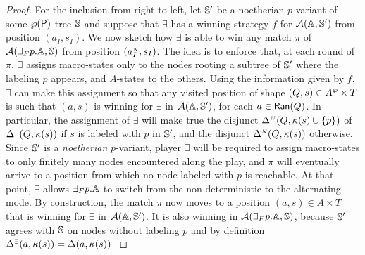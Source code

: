 \begin{proof}
For the inclusion from right to left, let $\mathbb{S}'$ be a noetherian $p$-variant of some ${\wp (\mathsf{P})}$-tree $\mathbb{S}$ and suppose that $\exists$ has a winning strategy $f$ for $\mathcal{A}(\mathbb{A},\mathbb{S}')$ from position $(a_I,s_I)$. We now sketch how $\exists$ is able to win any match $\pi$ of $\mathcal{A}({{\exists}_F p}.\mathbb{A},\mathbb{S})$ from position $(a_I^{{\scriptscriptstyle N}},s_I)$. The idea is to enforce that, at each round of $\pi$, $\exists$ assigns macro-states only to the nodes rooting a subtree of $\mathbb{S}'$ where the labeling $p$ appears, and $A$-states to the others. Using the information given by $f$, $\exists$ can make this assignment so that any visited position of shape $(Q,s) \in A^{\wp} \times T$ is such that $(a,s)$ is winning for $\exists$ in $\mathcal{A}(\mathbb{A},\mathbb{S}')$, for each $a \in \mathsf{Ran}(Q)$. In particular, the assignment of $\exists$ will make true the disjunct $\Delta^{{\scriptscriptstyle N}}(Q,\kappa(s)\cup\{p\})$ of $\Delta^\exists(Q,\kappa(s))$ if $s$ is labeled with $p$ in $\mathbb{S}'$, and the disjunct $\Delta^{{\scriptscriptstyle N}}(Q,\kappa(s))$ otherwise. Since $\mathbb{S}'$ is a \emph{noetherian} $p$-variant, player $\exists$ will be required to assign macro-states to only finitely many nodes encountered along the play, and $\pi$ will eventually arrive to a position from which no node labeled with $p$ is reachable. At that point, $\exists$ allows ${{\exists}_F p}.\mathbb{A}$ to switch from the non-deterministic to the alternating mode. By construction, the match $\pi$ now moves to a position $(a,s) \in A \times T$ that is winning for $\exists$ in $\mathcal{A}(\mathbb{A},\mathbb{S}')$. It is also winning in $\mathcal{A}({{\exists}_F p}.\mathbb{A},\mathbb{S})$, because $\mathbb{S}'$ agrees with $\mathbb{S}$ on nodes without labeling $p$ and by definition $\Delta^\exists(a,\kappa(s)) = \Delta(a,\kappa(s))$. %
\end{proof}

